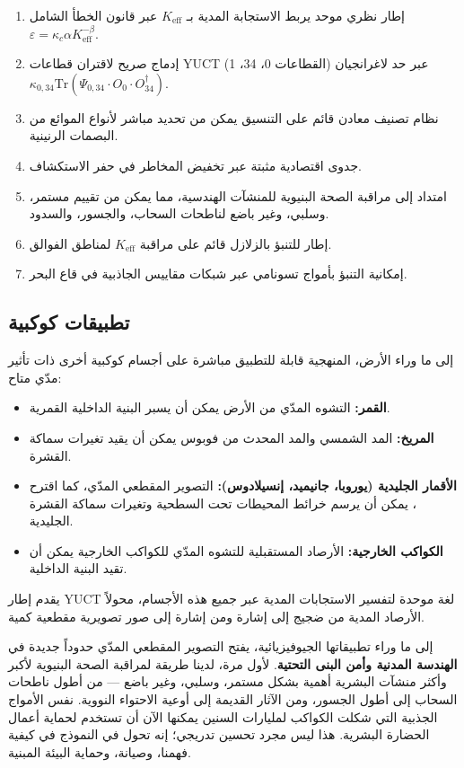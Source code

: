\documentclass[12pt,a4paper]{article}
\newcommand{\Keff}{K_{\mathrm{eff}}}
\newcommand{\kappac}{\kappa_c}
\newcommand{\eps}{\varepsilon}
\theoremstyle{remark}
\begin{document}
	\begin{enumerate}
		\item إطار نظري موحد يربط الاستجابة المدية بـ \(\Keff\) عبر قانون الخطأ الشامل \(\eps = \kappac \alpha \Keff^{-\beta}\).
		\item إدماج صريح لاقتران قطاعات YUCT (القطاعات 0، 34، 1) عبر حد لاغرانجيان \(\kappa_{0,34} \mathrm{Tr}(\Psi_{0,34} \cdot O_0 \cdot O_{34}^\dagger)\).
		\item نظام تصنيف معادن قائم على التنسيق يمكن من تحديد مباشر لأنواع الموائع من البصمات الرنينية.
		\item جدوى اقتصادية مثبتة عبر تخفيض المخاطر في حفر الاستكشاف.
		\item امتداد إلى مراقبة الصحة البنيوية للمنشآت الهندسية، مما يمكن من تقييم مستمر، وسلبي، وغير باضع لناطحات السحاب، والجسور، والسدود.
		\item إطار للتنبؤ بالزلازل قائم على مراقبة \(K_{\mathrm{eff}}\) لمناطق الفوالق.
		\item إمكانية التنبؤ بأمواج تسونامي عبر شبكات مقاييس الجاذبية في قاع البحر.
	\end{enumerate}
	
	\subsection{تطبيقات كوكبية}
	
	إلى ما وراء الأرض، المنهجية قابلة للتطبيق مباشرة على أجسام كوكبية أخرى ذات تأثير مدّي متاح:
	
	\begin{itemize}
		\item \textbf{القمر:} التشوه المدّي من الأرض يمكن أن يسبر البنية الداخلية القمرية.
		\item \textbf{المريخ:} المد الشمسي والمد المحدث من فوبوس يمكن أن يقيد تغيرات سماكة القشرة.
		\item \textbf{الأقمار الجليدية (يوروبا، جانيميد، إنسيلادوس):} التصوير المقطعي المدّي، كما اقترح \cite{RoviraNavarro2025}، يمكن أن يرسم خرائط المحيطات تحت السطحية وتغيرات سماكة القشرة الجليدية.
		\item \textbf{الكواكب الخارجية:} الأرصاد المستقبلية للتشوه المدّي للكواكب الخارجية يمكن أن تقيد البنية الداخلية.
	\end{itemize}
	
	يقدم إطار YUCT لغة موحدة لتفسير الاستجابات المدية عبر جميع هذه الأجسام، محولاً الأرصاد المدية من ضجيج إلى إشارة ومن إشارة إلى صور تصويرية مقطعية كمية.
	
	إلى ما وراء تطبيقاتها الجيوفيزيائية، يفتح التصوير المقطعي المدّي حدوداً جديدة في \textbf{الهندسة المدنية وأمن البنى التحتية}. لأول مرة، لدينا طريقة لمراقبة الصحة البنيوية لأكبر وأكثر منشآت البشرية أهمية بشكل مستمر، وسلبي، وغير باضع — من أطول ناطحات السحاب إلى أطول الجسور، ومن الآثار القديمة إلى أوعية الاحتواء النووية. نفس الأمواج الجذبية التي شكلت الكواكب لمليارات السنين يمكنها الآن أن تستخدم لحماية أعمال الحضارة البشرية. هذا ليس مجرد تحسين تدريجي؛ إنه تحول في النموذج في كيفية فهمنا، وصيانة، وحماية البيئة المبنية.
	
\end{document}
